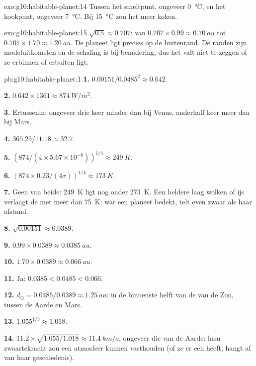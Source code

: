 \begin{solution}{exo:g10:habitable-planet:14}
Tussen het smeltpunt, ongeveer \qty{0}{\degreeCelsius}, en het kookpunt,
ongeveer \qty{7}{\degreeCelsius}. Bij \qty{15}{\degreeCelsius} zou het meer
koken.
\end{solution}

\begin{solution}{exo:g10:habitable-planet:15}
$\sqrt{0.5} \approx 0.707$: van $0.707 \times 0.99 \approx \qty{0.70}{au}$
tot $0.707 \times 1.70 \approx \qty{1.20}{au}$. De planeet ligt precies op de
buitenrand. De randen zijn modeluitkomsten en de schaling is bij benadering,
dus het valt niet te zeggen of ze erbinnen of erbuiten ligt.
\end{solution}

\begin{solution}{pb:g10:habitable-planet:1}
\textbf{1.} $0.00151/0.0485^2 \approx 0.642$.

\textbf{2.} $0.642 \times 1361 \approx \qty{874}{W/m^2}$.

\textbf{3.} Ertussenin: ongeveer drie keer minder dan bij Venus, anderhalf keer
meer dan bij Mars.

\textbf{4.} $365.25/11.18 \approx 32.7$.

\textbf{5.} $(874/(4 \times 5.67\times10^{-8}))^{1/4} \approx \qty{249}{K}$.

\textbf{6.} $(874 \times 0.23/(4\sigma))^{1/4} \approx \qty{173}{K}$.

\textbf{7.} Geen van beide: \qty{249}{K} ligt nog onder \qty{273}{K}. Een
heldere laag wolken of ijs verlaagt de  met meer dan
\qty{75}{K}: wat een planeet bedekt, telt even zwaar als haar afstand.

\textbf{8.} $\sqrt{0.00151} \approx 0.0389$.

\textbf{9.} $0.99 \times 0.0389 \approx \qty{0.0385}{au}$.

\textbf{10.} $1.70 \times 0.0389 \approx \qty{0.066}{au}$.

\textbf{11.} Ja: $0.0385 < 0.0485 < 0.066$.

\textbf{12.} $d_\odot = 0.0485/0.0389 \approx \qty{1.25}{au}$: in de binnenste
helft van de  van de Zon, tussen de Aarde en Mars.

\textbf{13.} $1.055^{1/3} \approx 1.018$.

\textbf{14.} $11.2 \times \sqrt{1.055/1.018} \approx \qty{11.4}{km/s}$, ongeveer
die van de Aarde: haar zwaartekracht zou een atmosfeer kunnen vasthouden (of ze
er een heeft, hangt af van haar geschiedenis).


\end{solution}
